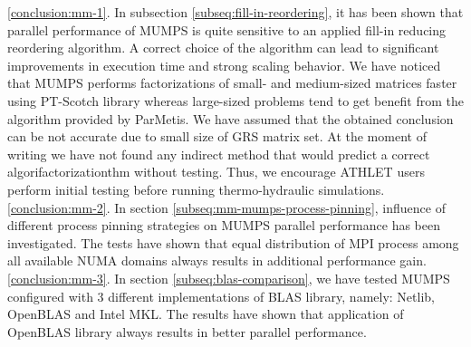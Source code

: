 \ref{conclusion:mm-1}. In subsection \ref{subseq:fill-in-reordering}, it has been shown that parallel performance of MUMPS is quite sensitive to an applied fill-in reducing reordering algorithm. A correct choice of the algorithm can lead to significant improvements in execution time and strong scaling behavior. We have noticed that MUMPS performs factorizations of small- and medium-sized matrices faster using PT-Scotch library whereas large-sized problems tend to get benefit from the algorithm provided by ParMetis. We have assumed that the obtained conclusion can be not accurate due to small size of GRS matrix set. At the moment of writing  we have not found any indirect method that would predict a correct algorifactorizationthm without testing. Thus, we encourage ATHLET users perform initial testing before running thermo-hydraulic simulations.\\




\ref{conclusion:mm-2}. In section \ref{subseq:mm-mumps-process-pinning}, influence of different process pinning strategies on MUMPS parallel performance has been investigated. The tests have shown that equal distribution of MPI process among all available NUMA domains always results in additional performance gain.\\ %


\ref{conclusion:mm-3}. 
In section \ref{subseq:blas-comparison},
we have tested MUMPS configured with 3 different implementations of BLAS library, namely: Netlib, OpenBLAS and Intel MKL. The results have shown that application of OpenBLAS library always results in better parallel performance.\\



